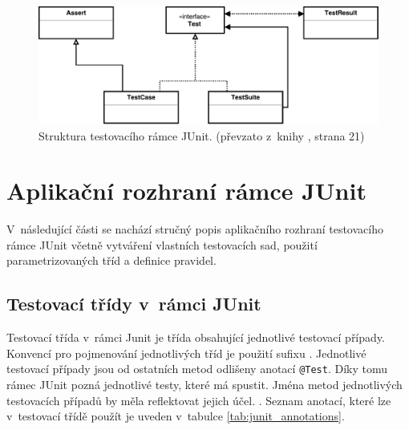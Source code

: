     \begin{figure}
      \includegraphics[width=\textwidth, center]{obrazky-figures/junit_arch.pdf}
      \caption{Struktura testovacího rámce JUnit. (převzato z~knihy \cite{JUnitGuide}, strana 21)}
      \label{fig:junit_arch}
    \end{figure}


  \section{Aplikační rozhraní rámce JUnit}
  V~následující části se nachází stručný popis aplikačního rozhraní testovacího rámce JUnit včetně vytváření vlastních testovacích sad, použití parametrizovaných tříd a definice pravidel.

    \subsection{Testovací třídy v~rámci JUnit}
    Testovací třída v~rámci Junit je třída obsahující jednotlivé testovací případy. Konvencí pro pojmenování jednotlivých tříd je použití sufixu . Jednotlivé testovací případy jsou od ostatních metod odlišeny anotací \texttt{@Test}. Díky tomu rámec JUnit pozná jednotlivé testy, které má spustit. Jména metod jednotlivých testovacích případů by měla reflektovat jejich účel.  \cite{vogella:JUnit}. Seznam anotací, které lze v~testovací třídě použít je uveden v~tabulce \ref{tab:junit_annotations}.

